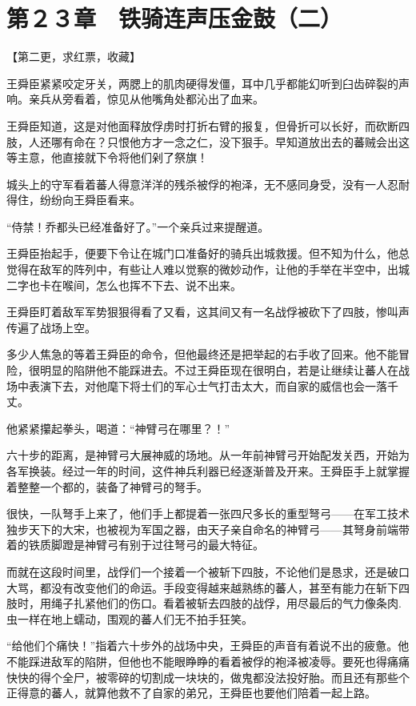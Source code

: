 \section{第２３章　铁骑连声压金鼓（二） }

【第二更，求红票，收藏】

王舜臣紧紧咬定牙关，两腮上的肌肉硬得发僵，耳中几乎都能幻听到臼齿碎裂的声响。亲兵从旁看着，惊见从他嘴角处都沁出了血来。

王舜臣知道，这是对他面释放俘虏时打折右臂的报复，但骨折可以长好，而砍断四肢，人还哪有命在？只恨他方才一念之仁，没下狠手。早知道放出去的蕃贼会出这等主意，他直接就下令将他们剁了祭旗！

城头上的守军看着蕃人得意洋洋的残杀被俘的袍泽，无不感同身受，没有一人忍耐得住，纷纷向王舜臣看来。

“侍禁！乔都头已经准备好了。”一个亲兵过来提醒道。

王舜臣抬起手，便要下令让在城门口准备好的骑兵出城救援。但不知为什么，他总觉得在敌军的阵列中，有些让人难以觉察的微妙动作，让他的手举在半空中，出城二字也卡在喉间，怎么也挥不下去、说不出来。

王舜臣盯着敌军军势狠狠得看了又看，这其间又有一名战俘被砍下了四肢，惨叫声传遍了战场上空。

多少人焦急的等着王舜臣的命令，但他最终还是把举起的右手收了回来。他不能冒险，很明显的陷阱他不能踩进去。不过王舜臣现在很明白，若是让继续让蕃人在战场中表演下去，对他麾下将士们的军心士气打击太大，而自家的威信也会一落千丈。

他紧紧攥起拳头，喝道：“神臂弓在哪里？！”

六十步的距离，是神臂弓大展神威的场地。从一年前神臂弓开始配发关西，开始为各军换装。经过一年的时间，这件神兵利器已经逐渐普及开来。王舜臣手上就掌握着整整一个都的，装备了神臂弓的弩手。

很快，一队弩手上来了，他们手上都提着一张四尺多长的重型弩弓——在军工技术独步天下的大宋，也被视为军国之器，由天子亲自命名的神臂弓——其弩身前端带着的铁质脚蹬是神臂弓有别于过往弩弓的最大特征。

而就在这段时间里，战俘们一个接着一个被斩下四肢，不论他们是恳求，还是破口大骂，都没有改变他们的命运。手段变得越来越熟练的蕃人，甚至有能力在斩下四肢时，用绳子扎紧他们的伤口。看着被斩去四肢的战俘，用尽最后的气力像条肉.虫一样在地上蠕动，围观的蕃人们无不拍手狂笑。

“给他们个痛快！”指着六十步外的战场中央，王舜臣的声音有着说不出的疲惫。他不能踩进敌军的陷阱，但他也不能眼睁睁的看着被俘的袍泽被凌辱。要死也得痛痛快快的得个全尸，被零碎的切割成一块块的，做鬼都没法投好胎。而且还有那些个正得意的蕃人，就算他救不了自家的弟兄，王舜臣也要他们陪着一起上路。

